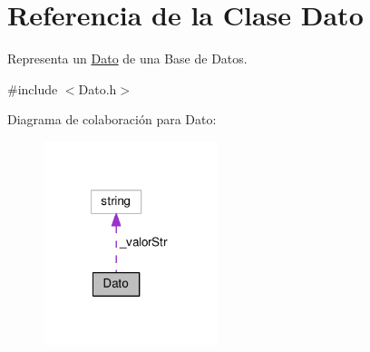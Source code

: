 \hypertarget{classDato}{\section{Referencia de la Clase Dato}
\label{classDato}
}


Representa un \hyperlink{classDato}{Dato} de una Base de Datos.  




{\ttfamily \#include $<$Dato.\-h$>$}



Diagrama de colaboración para Dato\-:\nopagebreak
\begin{figure}[H]
\begin{center}
\leavevmode
\includegraphics[width=143pt]{classDato__coll__graph}
\end{center}
\end{figure}
